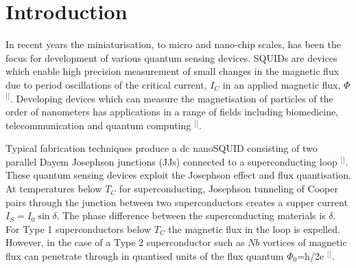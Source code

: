 \section{\label{sec:level1}Introduction}
In recent years the miniaturisation, to micro and nano-chip scales, has been the focus for development of various quantum sensing devices. SQUIDs are devices which enable high precision measurement of small changes in the magnetic flux due to period oscillations of the critical current, $I_C$ in an applied magnetic flux, $\Phi$ $^[$\citep{Podd2007Micro-SQUIDsJunctions}${}^]$. Developing devices which can measure the magnetisation of particles of the order of nanometers has applications in a range of fields including biomedicine, telecommunication and quantum computing $^[$\citep{Hao2015FabricationJunctions}${}^]$.

Typical fabrication techniques produce a dc nanoSQUID consisting of two parallel Dayem Josephson junctions (JJs) connected to a superconducting loop $^[$\citep{Hao2015FabricationJunctions}${}^]$. These quantum sensing devices exploit the Josephson effect and flux quantisation. At temperatures below $T_C$ for superconducting, Josephson tunneling of Cooper pairs through the junction between two superconductors creates a supper current $I_S=I_0\sin\delta$. The phase difference between the superconducting materials is $\delta$. For Type 1 superconductors below $T_C$ the magnetic flux in the loop is expelled. However, in the case of a Type 2 superconductor such as $Nb$ vortices of magnetic flux can penetrate through in quantised units of the flux quantum ${\Phi _0}$=h/2e $^[$\citep{Clarke2005TheHandbook}${}^]$.